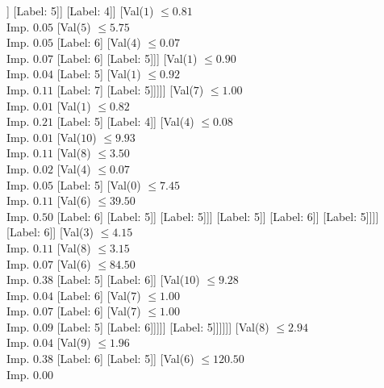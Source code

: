 \documentclass[margin=10pt]{standalone}
\begin{document}
\begin{forest}
											[Val($7$) $ \leq 1.00$ \\ Imp. $0.50$
												[Label: 5]
												[Label: 3]]
											[Label: 5]]
										[Label: 4]]
									[Val($1$) $ \leq 0.81$ \\ Imp. $0.05$
										[Val($5$) $ \leq 5.75$ \\ Imp. $0.05$
											[Label: 6]
											[Val($4$) $ \leq 0.07$ \\ Imp. $0.07$
												[Label: 6]
												[Label: 5]]]
										[Val($1$) $ \leq 0.90$ \\ Imp. $0.04$
											[Label: 5]
											[Val($1$) $ \leq 0.92$ \\ Imp. $0.11$
												[Label: 7]
												[Label: 5]]]]]
								[Val($7$) $ \leq 1.00$ \\ Imp. $0.01$
									[Val($1$) $ \leq 0.82$ \\ Imp. $0.21$
										[Label: 5]
										[Label: 4]]
									[Val($4$) $ \leq 0.08$ \\ Imp. $0.01$
										[Val($10$) $ \leq 9.93$ \\ Imp. $0.11$
											[Val($8$) $ \leq 3.50$ \\ Imp. $0.02$
												[Val($4$) $ \leq 0.07$ \\ Imp. $0.05$
													[Label: 5]
													[Val($0$) $ \leq 7.45$ \\ Imp. $0.11$
														[Val($6$) $ \leq 39.50$ \\ Imp. $0.50$
															[Label: 6]
															[Label: 5]]
														[Label: 5]]]
												[Label: 5]]
											[Label: 6]]
										[Label: 5]]]]
							[Label: 6]]
						[Val($3$) $ \leq 4.15$ \\ Imp. $0.11$
							[Val($8$) $ \leq 3.15$ \\ Imp. $0.07$
								[Val($6$) $ \leq 84.50$ \\ Imp. $0.38$
									[Label: 5]
									[Label: 6]]
								[Val($10$) $ \leq 9.28$ \\ Imp. $0.04$
									[Label: 6]
									[Val($7$) $ \leq 1.00$ \\ Imp. $0.07$
										[Label: 6]
										[Val($7$) $ \leq 1.00$ \\ Imp. $0.09$
											[Label: 5]
											[Label: 6]]]]]
							[Label: 5]]]]]]
		[Val($8$) $ \leq 2.94$ \\ Imp. $0.04$
			[Val($9$) $ \leq 1.96$ \\ Imp. $0.38$
				[Label: 6]
				[Label: 5]]
			[Val($6$) $ \leq 120.50$ \\ Imp. $0.00$

\end{forest}
\end{document}
